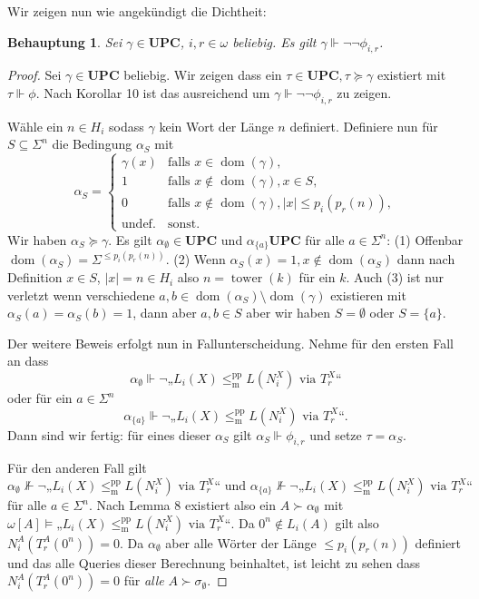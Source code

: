 \documentclass[nofonts]{uebung}
\newtheorem{claim}[theorem]{Behauptung}
\DeclareMathOperator{\dom}{dom}
\def\leqmpp{\ensuremath{\leq_\mathrm{m}^\mathrm{pp}}}
\DeclareMathOperator{\tower}{tower}
\begin{document}
Wir zeigen nun wie angekündigt die Dichtheit:

\begin{claim}
    Sei $\gamma\in\mathbf{UPC}$, $i,r\in\omega$ beliebig. Es gilt $\gamma\Vdash\neg\neg \phi_{i,r}$.
\end{claim}
\begin{proof}
    Sei $\gamma\in\mathbf{UPC}$ beliebig. Wir zeigen dass ein $\tau\in\mathbf{UPC}, \tau\succeq \gamma$ existiert mit $\tau\Vdash\phi$.
    Nach Korollar 10 ist das ausreichend um $\gamma\Vdash\neg\neg \phi_{i,r}$ zu zeigen.

    Wähle ein $n\in H_i$ sodass $\gamma$ kein Wort der Länge $n$ definiert.
    Definiere nun für $S\subseteq\Sigma^n$ die Bedingung $\alpha_S$ mit
    \[ \alpha_S  =\begin{cases}
    \gamma(x) & \text{falls $x\in\dom(\gamma)$},\\
    1 & \text{falls $x\not\in\dom(\gamma), x\in S$},\\
    0 & \text{falls $x\not\in\dom(\gamma), |x|\leq p_i(p_r(n))$},\\
    \text{undef.} & \text{sonst}.
    \end{cases}
    \]
    Wir haben $\alpha_S\succeq \gamma$.
    Es gilt $\alpha_\emptyset\in\mathbf{UPC}$ und $\alpha_{\{a\}}\mathbf{UPC}$ für alle $a\in \Sigma^n$: (1) Offenbar $\dom(\alpha_S)=\Sigma^{\leq p_i(p_r(n))}$. (2) Wenn $\alpha_S(x)=1,x\not\in\dom(\alpha_S)$ dann nach Definition $x\in S$, $|x|=n\in H_i$ also $n=\tower(k)$ für ein $k$.
    Auch (3) ist nur verletzt wenn verschiedene $a,b\in\dom(\alpha_S)\setminus\dom(\gamma)$ existieren mit $\alpha_S(a)=\alpha_S(b)=1$, dann aber $a,b\in S$ aber wir haben $S=\emptyset$ oder $S=\{a\}$.

    Der weitere Beweis erfolgt nun in Fallunterscheidung. Nehme für den ersten Fall an dass
    \[ \alpha_\emptyset \Vdash \neg„L_{i}(X)\leqmpp L(N_i^X)\text{ via }T^X_r“ \]
    oder für ein $a\in\Sigma^n$
    \[ \alpha_{\{a\}} \Vdash \neg„L_{i}(X)\leqmpp L(N_i^X)\text{ via }T^X_r“. \]
    Dann sind wir fertig: für eines dieser $\alpha_S$ gilt $\alpha_S\Vdash \phi_{i,r}$ und setze $\tau=\alpha_S$.

    Für den anderen Fall gilt 
    \[ \alpha_\emptyset \not\Vdash \neg„L_{i}(X)\leqmpp L(N_i^X)\text{ via }T^X_r“ \text{ und }\alpha_{\{a\}} \not\Vdash \neg„L_{i}(X)\leqmpp L(N_i^X)\text{ via }T^X_r“ \]
    für alle $a\in\Sigma^n$.
    Nach Lemma 8 existiert also ein $A\succ\alpha_\emptyset$ mit $\omega[A] \vDash „L_{i}(X)\leqmpp L(N_i^X)\text{ via }T^X_r“$.
    Da $0^n\not\in L_i(A)$ gilt also $N^A_i(T_r^A(0^n))=0$.
    Da $\alpha_\emptyset$ aber alle Wörter der Länge $\leq p_i(p_r(n))$ definiert und das alle Queries dieser Berechnung beinhaltet, ist leicht zu sehen dass $N^A_i(T_r^A(0^n))=0$ für \emph{alle} $A\succ\sigma_\emptyset$.


\end{proof}
\end{document}
